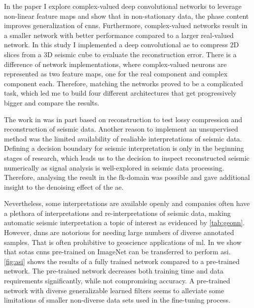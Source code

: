 In the paper  \citep{dramsch2019complex} I explore complex-valued deep convolutional networks to leverage non-linear feature maps and show that in non-stationary data, the phase content improves generalization of \acp{cnn}. Furthermore, complex-valued networks result in a smaller network with better performance compared to a larger real-valued network. In this study I implemented a deep convolutional \acl{ae} to compress 2D slices from a 3D seismic cube to evaluate the reconstruction error. There is a difference of network implementations, where complex-valued neurons are represented as two feature maps, one for the real component and complex component each. Therefore, matching the networks proved to be a complicated task, which led me to build four different architectures that get progressively bigger and compare the results.

The work in  \citep{dramsch2019complex} was in part based on reconstruction to test lossy compression and reconstruction of seismic data. Another reason to implement an unsupervised method was the limited availability of realiable interpretations of seismic data. Defining a decision boundary for seismic interpretation is only in the beginning stages of research, which leads us to the decision to inspect reconstructed seismic numerically as signal analysis is well-explored in seismic data processing. Therefore, analysing the result in the \ac{fk}-domain was possible and gave additional insight to the denoising effect of the \ac{ae}.

Nevertheless, some interpretations are available openly and companies often have a plethora of interpretations and re-interpretations of seismic data, making automatic seismic interpretation a topic of interest as evidenced by \cref{tab:geonn}. However, \aclp{dnn} are notorious for needing large numbers of diverse annotated samples. That is often prohibitive to geoscience applications of \acl{ml}. In  \citep{dramsch2018deep} we show that \aclp{sota} \aclp{cnn} pre-trained on ImageNet can be transferred to perform \acl{asi}. \cref{fig:asi} shows the results of a fully trained network compared to a pre-trained network. The pre-trained network decreases both training time and data requirements significantly, while not compromising accuracy. A pre-trained network with diverse generalizable learned filters seems to alleviate some limitations of smaller non-diverse data sets used in the fine-tuning process.

